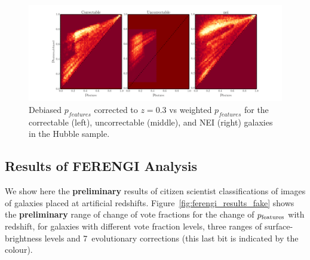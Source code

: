 \documentclass[usenatbib]{mn2e}
\begin{document}
\begin{figure}
\begin{center}
\includegraphics[width=\textwidth]{figures/debiased_corrections.pdf}
\caption{Debiased $p_{features}$ corrected to $z=0.3$ vs weighted $p_{features}$ for the correctable (left), uncorrectable (middle), and NEI (right) galaxies in the Hubble sample.}

\label{fig:features_corrections}
\end{center}
\end{figure}

\subsection{Results of FERENGI Analysis}

We show here the {\bf preliminary} results of citizen scientist classifications of images of galaxies placed at artificial redshifts. Figure~\ref{fig:ferengi_results_fake} shows the {\bf preliminary} range of change of vote fractions for the change of $p_{\rm features}$ with redshift, for galaxies with different vote fraction levels, three ranges of surface-brightness levels and 7~evolutionary corrections (this last bit is indicated by the colour). 
\end{document}
